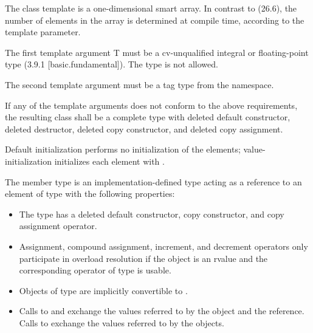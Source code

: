 

\pnum The class template \datapar{} is a one-dimensional smart array.
In contrast to  (26.6), the number of elements in the array is determined at compile time, according to the  template parameter.

\pnum The first template argument \type T must be a cv-unqualified integral or floating-point type (3.9.1 [basic.fundamental]).
The type \bool is not allowed.

\pnum The second template argument  must be a tag type from the  namespace.

\pnum If any of the template arguments does not conform to the above requirements, the resulting class shall be a complete type with deleted default constructor, deleted destructor, deleted copy constructor, and deleted copy assignment.

\pnum Default initialization performs no initialization of the elements; value-initialization initializes each element with .

\pnum The member type  is an implementation-defined type acting as a reference to an element of type  with the following properties:
\label{sec:reference type}
\begin{itemize}
  \item The type has a deleted default constructor, copy constructor, and copy assignment operator.

  \item Assignment, compound assignment, increment, and decrement operators only participate in overload resolution if the  object is an rvalue and the corresponding operator of type  is usable.

  \item Objects of type  are implicitly convertible to .

  \item Calls to  and  exchange the values referred to by the  object and the  reference.
  Calls to  exchange the values referred to by the  objects.
\end{itemize}

